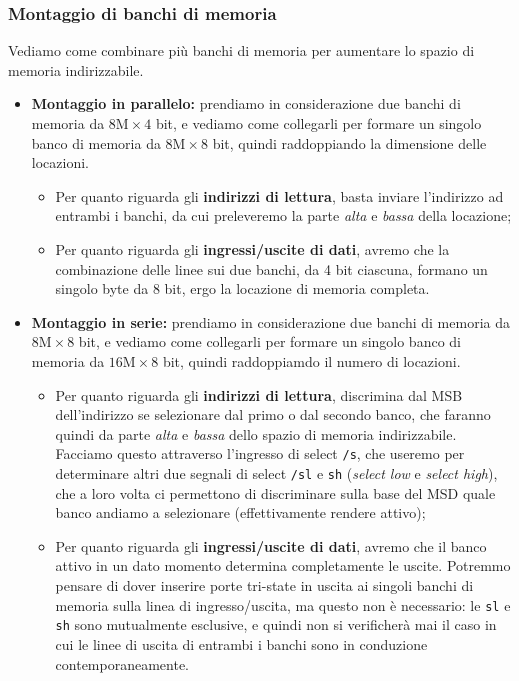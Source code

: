 \documentclass[a4paper,11pt]{article}
\begin{document}
\subsubsection{Montaggio di banchi di memoria}
Vediamo come combinare più banchi di memoria per aumentare lo spazio di memoria indirizzabile.
\begin{itemize}
	\item \textbf{Montaggio in parallelo:} 
prendiamo in considerazione due banchi di memoria da $8 \text{M} \times 4$ bit, e vediamo come collegarli per formare un singolo banco di memoria da $8 \text{M} \times 8$ bit, quindi raddoppiando la dimensione delle locazioni.
\begin{itemize}
	\item Per quanto riguarda gli \textbf{indirizzi di lettura}, basta inviare l'indirizzo ad entrambi i banchi, da cui preleveremo la parte \textit{alta} e \textit{bassa} della locazione;
	\item Per quanto riguarda gli \textbf{ingressi/uscite di dati}, avremo che la combinazione delle linee sui due banchi, da 4 bit ciascuna, formano un singolo byte da 8 bit, ergo la locazione di memoria completa.
\end{itemize}
	\item \textbf{Montaggio in serie:}  
prendiamo in considerazione due banchi di memoria da $8 \text{M} \times 8$ bit, e vediamo come collegarli per formare un singolo banco di memoria da $16 \text{M} \times 8$ bit, quindi raddoppiamdo il numero di locazioni.
\begin{itemize}
	\item Per quanto riguarda gli \textbf{indirizzi di lettura}, discrimina dal MSB dell'indirizzo se selezionare dal primo o dal secondo banco, che faranno quindi da parte \textit{alta} e \textit{bassa} dello spazio di memoria indirizzabile. Facciamo questo attraverso l'ingresso di select \lstinline|/s|, che useremo per determinare altri due segnali di select \lstinline|/sl| e \lstinline|sh| (\textit{select low} e \textit{select high}), che a loro volta ci permettono di discriminare sulla base del MSD quale banco andiamo a selezionare (effettivamente rendere attivo); 
	\item Per quanto riguarda gli \textbf{ingressi/uscite di dati}, avremo che il banco attivo in un dato momento determina completamente le uscite. Potremmo pensare di dover inserire porte tri-state in uscita ai singoli banchi di memoria sulla linea di ingresso/uscita, ma questo non è necessario: le \lstinline|sl| e \lstinline|sh| sono mutualmente esclusive, e quindi non si verificherà mai il caso in cui le linee di uscita di entrambi i banchi sono in conduzione contemporaneamente.
\end{itemize}
\end{itemize}
\end{document}
